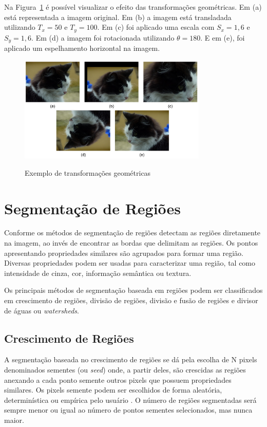 \documentclass[12pt,oneside,a4paper,english,french,spanish,brazil,]{abntex2}
\begin{document}
Na Figura~\ref{fig:PDI_Transformacoes_Geometricas} é possível visualizar o efeito das transformações geométricas. Em (a) está representada a imagem original. Em (b) a imagem está transladada utilizando \(T_x=50\) e \(T_y=100\). Em (c) foi aplicado uma escala com \(S_x=1,6\) e \(S_y=1,6\). Em (d) a imagem foi rotacionada utilizando \(\theta=180\). E em (e), foi aplicado um espelhamento horizontal na imagem.

\begin{figure}[ht]
\centering
\caption{Exemplo de transformações geométricas}
\includegraphics[width=0.8\textwidth]{imagens/PDI_Transformacoes_Geometricas.pdf}
\sourceAuthor
\label{fig:PDI_Transformacoes_Geometricas}
\end{figure}

\section{Segmentação de Regiões}
Conforme \cite{pedrini:2008} os métodos de segmentação de regiões detectam as regiões diretamente na imagem, ao invés de encontrar as bordas que delimitam as regiões. Os pontos apresentando propriedades similares são agrupados para formar uma região. Diversas propriedades podem ser usadas para caracterizar uma região, tal como intensidade de cinza, cor, informação semântica ou textura.

Os principais métodos de segmentação baseada em regiões podem ser classificados em crescimento de regiões, divisão de regiões, divisão e fusão de regiões e divisor de águas ou \textit{watersheds}.

\subsection{Crescimento de Regiões}

A segmentação baseada no crescimento de regiões se dá pela escolha de N pixels denominados sementes (ou \textit{seed}) onde, a partir deles, são crescidas as regiões anexando a cada ponto semente outros pixels que possuem propriedades similares. Os pixels semente podem ser escolhidos de forma aleatória, determinística ou empírica pelo usuário \cite{pedrini:2008}. O número de regiões segmentadas será sempre menor ou igual ao número de pontos sementes selecionados, mas nunca maior.
\end{document}
